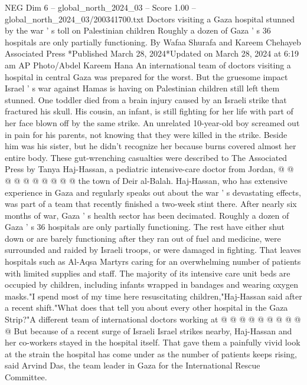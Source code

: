 \begin{textsample}{NEG Dim 6 – global\_north\_2024\_03 – Score 1.00 – global\_north\_2024\_03/200341700.txt}  \label{ex:f6_neg_401}
Doctors visiting a Gaza hospital stunned by the war ' s toll on Palestinian children Roughly a dozen of Gaza ' s 36 hospitals are only partially functioning.
By Wafaa Shurafa and Kareem Chehayeb Associated Press *Published March 28, 2024*Updated on March 28, 2024 at 6:19 am AP Photo/Abdel Kareem Hana An international team of doctors visiting a hospital in central Gaza was prepared for the worst.
But the gruesome impact Israel ' s war against Hamas is having on Palestinian children still left them stunned.
One toddler died from a brain injury caused by an Israeli strike that fractured his skull.
His cousin, an infant, is still fighting for her life with part of her face blown off by the same strike.
An unrelated 10-year-old boy screamed out in pain for his parents, not knowing that they were killed in the strike.
Beside him was his sister, but he didn't recognize her because burns covered almost her entire body.
These gut-wrenching casualties were described to The Associated Press by Tanya Haj-Hassan, a pediatric intensive-care doctor from Jordan, @ @ @ @ @ @ @ @ @ @ the town of Deir al-Balah.
Haj-Hassan, who has extensive experience in Gaza and regularly speaks out about the war ' s devastating effects, was part of a team that recently finished a two-week stint there.
After nearly six months of war, Gaza ' s health sector has been decimated.
Roughly a dozen of Gaza ' s 36 hospitals are only partially functioning.
The rest have either shut down or are barely functioning after they ran out of fuel and medicine, were surrounded and raided by Israeli troops, or were damaged in fighting.
That leaves hospitals such as Al-Aqsa Martyrs caring for an overwhelming number of patients with limited supplies and staff.
The majority of its intensive care unit beds are occupied by children, including infants wrapped in bandages and wearing oxygen masks."I spend most of my time here resuscitating children,"Haj-Hassan said after a recent shift."What does that tell you about every other hospital in the Gaza Strip?"A different team of international doctors working at @ @ @ @ @ @ @ @ @ @ But because of a recent surge of Israeli Israel strikes nearby, Haj-Hassan and her co-workers stayed in the hospital itself.
That gave them a painfully vivid look at the strain the hospital has come under as the number of patients keeps rising, said Arvind Das, the team leader in Gaza for the International Rescue Committee.

\end{textsample}
